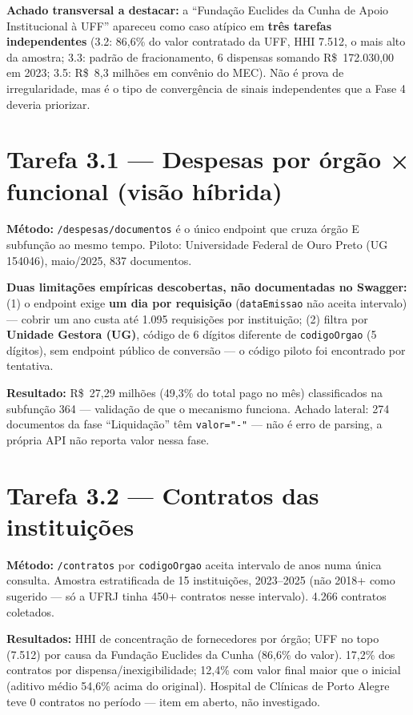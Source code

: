 \documentclass[11pt,a4paper]{article}
\begin{document}
\textbf{Achado transversal a destacar:} a ``Fundação Euclides da Cunha de
Apoio Institucional à UFF'' apareceu como caso atípico em \textbf{três
tarefas independentes} (3.2: 86,6\% do valor contratado da UFF, HHI 7.512,
o mais alto da amostra; 3.3: padrão de fracionamento, 6 dispensas somando
R\$~172.030,00 em 2023; 3.5: R\$~8,3 milhões em convênio do MEC). Não é
prova de irregularidade, mas é o tipo de convergência de sinais
independentes que a Fase 4 deveria priorizar.

\section{Tarefa 3.1 --- Despesas por órgão × funcional (visão híbrida)}

\textbf{Método:} \texttt{/despesas/documentos} é o único endpoint que
cruza órgão E subfunção ao mesmo tempo. Piloto: Universidade Federal de
Ouro Preto (UG 154046), maio/2025, 837 documentos.

\textbf{Duas limitações empíricas descobertas, não documentadas no
Swagger:} (1) o endpoint exige \textbf{um dia por requisição}
(\texttt{dataEmissao} não aceita intervalo) --- cobrir um ano custa até
1.095 requisições por instituição; (2) filtra por \textbf{Unidade Gestora
(UG)}, código de 6 dígitos diferente de \texttt{codigoOrgao} (5 dígitos),
sem endpoint público de conversão --- o código piloto foi encontrado por
tentativa.

\textbf{Resultado:} R\$~27,29 milhões (49,3\% do total pago no mês)
classificados na subfunção 364 --- validação de que o mecanismo funciona.
Achado lateral: 274 documentos da fase ``Liquidação'' têm \texttt{valor="-"}
--- não é erro de parsing, a própria API não reporta valor nessa fase.

\section{Tarefa 3.2 --- Contratos das instituições}

\textbf{Método:} \texttt{/contratos} por \texttt{codigoOrgao} aceita
intervalo de anos numa única consulta. Amostra estratificada de 15
instituições, 2023--2025 (não 2018+ como sugerido --- só a UFRJ tinha
450+ contratos nesse intervalo). 4.266 contratos coletados.

\textbf{Resultados:} HHI de concentração de fornecedores por órgão;
UFF no topo (7.512) por causa da Fundação Euclides da Cunha (86,6\% do
valor). 17,2\% dos contratos por dispensa/inexigibilidade; 12,4\% com
valor final maior que o inicial (aditivo médio 54,6\% acima do original).
Hospital de Clínicas de Porto Alegre teve 0 contratos no período --- item
em aberto, não investigado.
\end{document}
